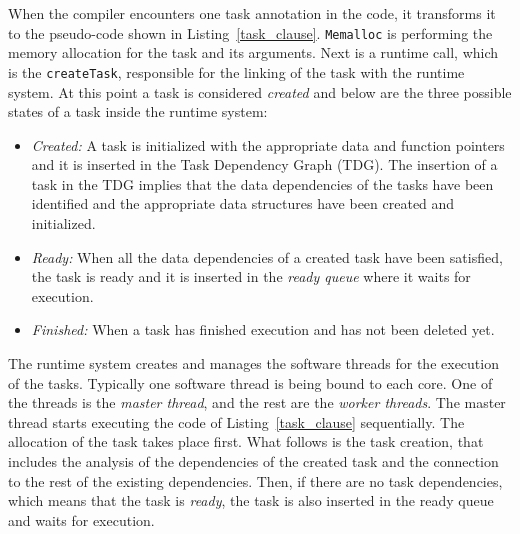 When the compiler encounters one task annotation in the code, it transforms it to the pseudo-code shown in Listing~\ref{task_clause}.
\texttt{Memalloc} is performing the memory allocation for the task and its arguments.
Next is a runtime call, which is the \texttt{createTask}, responsible for the linking of the task with the runtime system.
At this point a task is considered \textit{created} and below are the three possible states of a task inside the runtime system:
\begin{itemize}
\item \textit{Created:} A task is initialized with the appropriate data and function pointers and it is inserted in the Task Dependency Graph (TDG). The insertion of a task in the TDG implies that the data dependencies of the tasks have been identified and the appropriate data structures have been created and initialized. 
\item \textit{Ready:} When all the data dependencies of a created task have been satisfied, the task is ready and it is inserted in the \textit{ready queue} where it waits for execution. 
\item \textit{Finished:} When a task has finished execution and has not been deleted yet.
\end{itemize}

The runtime system creates and manages the software threads for the execution of the tasks. 
Typically one software thread is being bound to each core. 
One of the threads is the \textit{master thread}, and the rest are the \textit{worker threads}. 
The master thread starts executing the code of Listing~\ref{task_clause} sequentially. 
The allocation of the task takes place first.
What follows is the task creation, that includes the analysis of the dependencies of the created task and the connection to the rest of the existing dependencies.
Then, if there are no task dependencies, which means that the task is \textit{ready}, the task is also inserted in the ready queue and waits for execution.

